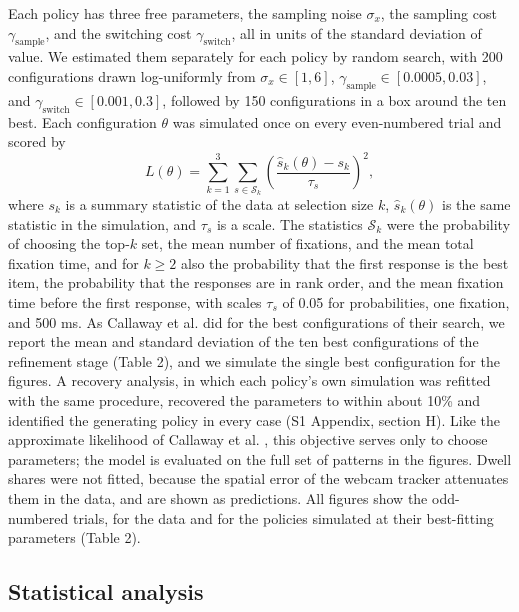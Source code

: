 \documentclass[10pt,letterpaper]{article}
\begin{document}
Each policy has three free parameters, the sampling noise \(\sigma_x\),
the sampling cost \(\gamma_{\text{sample}}\), and the switching cost
\(\gamma_{\text{switch}}\), all in units of the standard deviation of
value. We estimated them separately for each policy by random search,
with 200 configurations drawn log-uniformly from
\(\sigma_x \in [1, 6]\), \(\gamma_{\text{sample}} \in [0.0005, 0.03]\),
and \(\gamma_{\text{switch}} \in [0.001, 0.3]\), followed by 150
configurations in a box around the ten best. Each configuration
\(\theta\) was simulated once on every even-numbered trial and scored by
\begin{equation}
L(\theta) = \sum_{k=1}^{3} \sum_{s \in \mathcal{S}_k} \left(\frac{\hat{s}_k(\theta) - s_k}{\tau_s}\right)^{2}, 
\end{equation} where \(s_k\) is a summary statistic of the data at
selection size \(k\), \(\hat{s}_k(\theta)\) is the same statistic in the
simulation, and \(\tau_s\) is a scale. The statistics \(\mathcal{S}_k\)
were the probability of choosing the top-\(k\) set, the mean number of
fixations, and the mean total fixation time, and for \(k \ge 2\) also
the probability that the first response is the best item, the
probability that the responses are in rank order, and the mean fixation
time before the first response, with scales \(\tau_s\) of 0.05 for
probabilities, one fixation, and 500 ms. As Callaway et al.
\cite{callaway2021} did for the best configurations of their search, we
report the mean and standard deviation of the ten best configurations of
the refinement stage (Table 2), and we simulate the single best
configuration for the figures. A recovery analysis, in which each
policy's own simulation was refitted with the same procedure, recovered
the parameters to within about 10\% and identified the generating policy
in every case (S1 Appendix, section H). Like the approximate likelihood
of Callaway et al. \cite{callaway2021}, this objective serves only to
choose parameters; the model is evaluated on the full set of patterns in
the figures. Dwell shares were not fitted, because the spatial error of
the webcam tracker attenuates them in the data, and are shown as
predictions. All figures show the odd-numbered trials, for the data and
for the policies simulated at their best-fitting parameters (Table 2).

\subsection*{Statistical analysis}\label{statistical-analysis}
\end{document}
